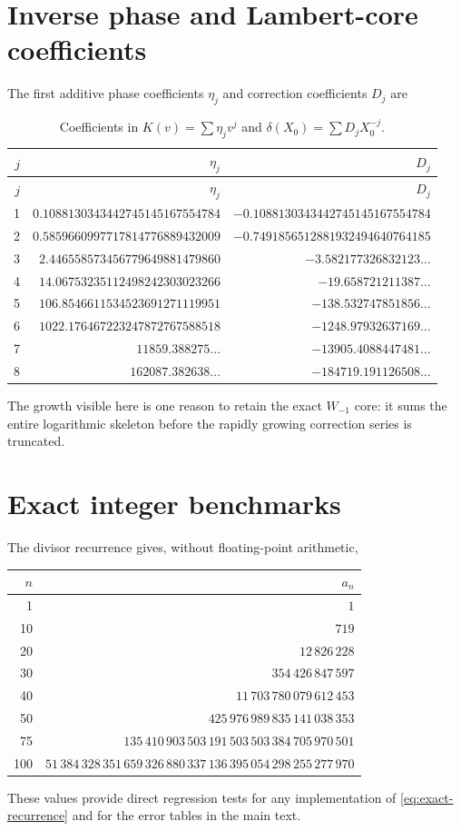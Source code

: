 \documentclass[11pt,a4paper,oneside,openany]{book}
\theoremstyle{definition}
\theoremstyle{remark}
\begin{document}
\section{Inverse phase and Lambert-core coefficients}
The first additive phase coefficients $\eta_j$ and correction coefficients
$D_j$ are
\begin{longtable}{r@{\quad}r@{\qquad}r}
\caption{Coefficients in $K(v)=\sum\eta_jv^j$ and
$\delta(X_0)=\sum D_jX_0^{-j}$.}
\label{tab:eta-D-audit}\\
\toprule
$j$ & $\eta_j$ & $D_j$\\
\midrule
\endfirsthead
\toprule
$j$ & $\eta_j$ & $D_j$\\
\midrule
\endhead
1 & $0.1088130343442745145167554784$ & $-0.1088130343442745145167554784$\\
2 & $0.5859660997717814776889432009$ & $-0.7491856512881932494640764185$\\
3 & $2.446558573456779649881479860$  & $-3.582177326832123\ldots$\\
4 & $14.06753235112498242303023266$  & $-19.658721211387\ldots$\\
5 & $106.8546611534523691271119951$  & $-138.532747851856\ldots$\\
6 & $1022.176467223247872767588518$  & $-1248.97932637169\ldots$\\
7 & $11859.388275\ldots$              & $-13905.4088447481\ldots$\\
8 & $162087.382638\ldots$             & $-184719.191126508\ldots$\\
\bottomrule
\end{longtable}
The growth visible here is one reason to retain the exact $W_{-1}$ core: it
sums the entire logarithmic skeleton before the rapidly growing correction
series is truncated.

\section{Exact integer benchmarks}
The divisor recurrence gives, without floating-point arithmetic,
\begin{center}
\begin{tabular}{r@{\qquad}r}
\toprule
$n$ & $a_n$\\
\midrule
1   & $1$\\
10  & $719$\\
20  & $12\,826\,228$\\
30  & $354\,426\,847\,597$\\
40  & $11\,703\,780\,079\,612\,453$\\
50  & $425\,976\,989\,835\,141\,038\,353$\\
75  & $135\,410\,903\,503\,191\,503\,503\,384\,705\,970\,501$\\
100 & $51\,384\,328\,351\,659\,326\,880\,337\,136\,395\,054\,298\,255\,277\,970$\\
\bottomrule
\end{tabular}
\end{center}
These values provide direct regression tests for any implementation of
\cref{eq:exact-recurrence} and for the error tables in the main text.
\end{document}
